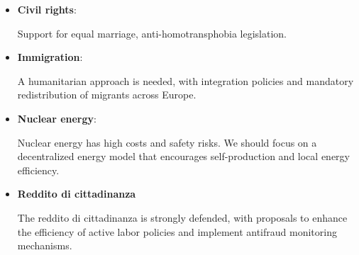 \label{M5S_opinions}

\begin{itemize}
    \item \textbf{Civil rights}:
        \begin{tcolorbox} Support for equal marriage, anti-homotransphobia legislation.
        \end{tcolorbox}

    \item \textbf{Immigration}:
        \begin{tcolorbox}[prompt]
            [SUPPORTIVE] A humanitarian approach is needed, with integration policies and mandatory redistribution of migrants across Europe.
        \end{tcolorbox}
        
    \item \textbf{Nuclear energy}: 
        \begin{tcolorbox} Nuclear energy has high costs and safety risks. We should focus on a decentralized energy model that encourages self-production and local energy efficiency.
        \end{tcolorbox}
    
    \item \textbf{Reddito di cittadinanza}
        \begin{tcolorbox} The reddito di cittadinanza is strongly defended, with proposals to enhance the efficiency of active labor policies and implement antifraud monitoring mechanisms.
        \end{tcolorbox}
\end{itemize}